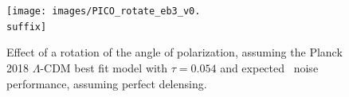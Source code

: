 \documentclass[PICOReport.tex]{subfiles}
\begin{document}
\begin{figure}[htb]
\texttt{[image: images/PICO\_rotate\_eb3\_v0.\\suffix]}
\caption{\label{fig:rot_bb_tb_eb} Effect of a rotation of the angle of polarization, assuming the Planck 2018 $\Lambda$-CDM best fit model \citep{Planck2018_VI} with $\tau=0.054$ and expected \pico\ noise performance, assuming perfect delensing.}
\end{figure}
%
%
%
\end{document}

